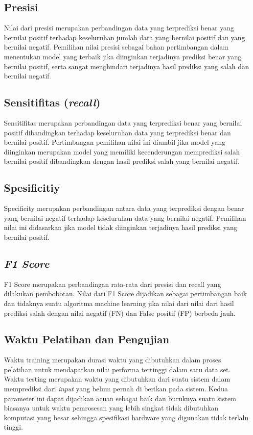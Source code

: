 \subsection{Presisi}
Nilai dari presisi merupakan perbandingan data yang terprediksi benar yang 
bernilai positif terhadap keseluruhan jumlah data yang bernilai positif dan 
yang bernilai negatif. Pemilihan nilai presisi sebagai bahan pertimbangan 
dalam 
menentukan model yang terbaik jika diinginkan terjadinya prediksi benar yang 
bernilai positif, serta sangat menghindari terjadinya hasil prediksi yang 
salah 
dan bernilai negatif. 

\subsection{Sensitifitas (\textit{recall})}
Sensitifitas merupakan perbandingan data yang terprediksi benar yang bernilai 
positif dibandingkan terhadap keseluruhan data yang terprediksi benar dan 
bernilai positif. Pertimbangan pemilihan nilai ini diambil jika model yang 
diinginkan merupakan model yang memiliki kecenderungan memprediksi salah 
bernilai positif dibandingkan dengan hasil prediksi salah yang bernilai 
negatif.

\subsection{Spesificitiy}
Specificity merupakan perbandingan antara data yang terprediksi dengan benar 
yang bernilai negatif terhadap keseluruhan data yang bernilai negatif. 
Pemilihan nilai ini didasarkan jika model tidak diinginkan terjadinya hasil 
prediksi yang bernilai positif.

\subsection{\textit{F1 Score}}
F1 Score merupakan perbandingan rata-rata dari presisi dan recall yang dilakukan pembobotan. Nilai dari F1 Score dijadikan sebagai pertimbangan baik dan tidaknya suatu algoritma machine learning jika nilai dari nilai dari hasil prediksi salah dengan nilai negatif (FN) dan False positif (FP) berbeda jauh.

\subsection{Waktu Pelatihan dan Pengujian}
Waktu training merupakan durasi waktu yang dibutuhkan dalam proses pelatihan untuk mendapatkan nilai performa tertinggi dalam satu data set. Waktu testing merupakan waktu yang dibutuhkan dari suatu sistem dalam memprediksi dari \textit{input} yang belum pernah di berikan pada sistem. Kedua parameter ini dapat dijadikan acuan sebagai baik dan buruknya suatu sistem biasanya untuk waktu pemrosesan  yang lebih singkat tidak dibutuhkan komputasi yang besar sehingga spesifikasi hardware yang digunakan tidak terlalu tinggi.

